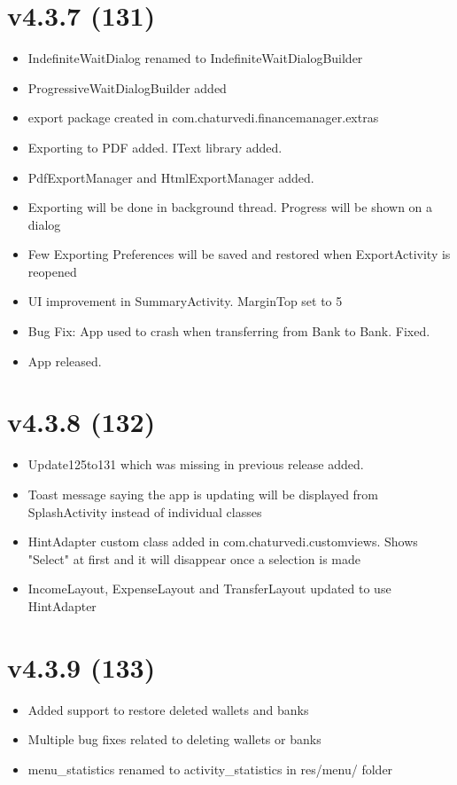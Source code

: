 \documentclass{article}
\begin{document}
\section{v4.3.7 (131)}
\begin{itemize}
\item IndefiniteWaitDialog renamed to IndefiniteWaitDialogBuilder
\item ProgressiveWaitDialogBuilder added
\item export package created in com.chaturvedi.financemanager.extras
\item Exporting to PDF added. IText library added.
\item PdfExportManager and HtmlExportManager added.
\item Exporting will be done in background thread. Progress will be shown on a dialog
\item Few Exporting Preferences will be saved and restored when ExportActivity is reopened
\item UI improvement in SummaryActivity. MarginTop set to 5%
\item Bug Fix: App used to crash when transferring from Bank to Bank. Fixed.
\item App released.
\end{itemize}

\section{v4.3.8 (132)}
\begin{itemize}
\item Update125to131 which was missing in previous release added.
\item Toast message saying the app is updating will be displayed from SplashActivity instead of individual classes
\item HintAdapter custom class added in com.chaturvedi.customviews. Shows "Select" at first and it will disappear once a selection is made
\item IncomeLayout, ExpenseLayout and TransferLayout updated to use HintAdapter
\end{itemize}

\section{v4.3.9 (133)}
\begin{itemize}
\item Added support to restore deleted wallets and banks
\item Multiple bug fixes related to deleting wallets or banks
\item menu\_statistics renamed to activity\_statistics in res/menu/ folder
\end{itemize}
\end{document}
